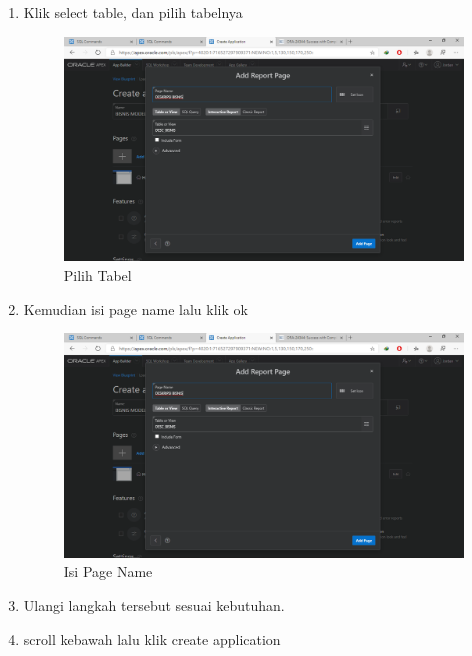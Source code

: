 \begin{enumerate}
\item Klik select table, dan pilih tabelnya
\begin{figure}[H]
\centering
\caption{Pilih Tabel}
\includegraphics[width=1\textwidth]{figures/4.png}
\end{figure}

\item Kemudian isi page name lalu klik ok
\begin{figure}[H]
\centering
\caption{Isi Page Name}
\includegraphics[width=1\textwidth]{figures/4.png}
\end{figure}

\item Ulangi langkah tersebut sesuai kebutuhan.

\item scroll kebawah lalu klik create application


\end{enumerate}
